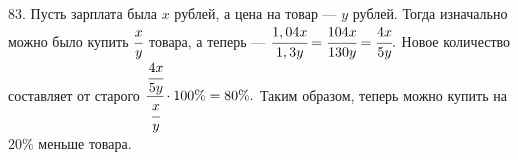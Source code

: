 83. Пусть зарплата была $x$ рублей, а цена на товар --- $y$ рублей. Тогда изначально можно было купить $\cfrac{x}{y}$ товара, а теперь --- $\cfrac{1,04x}{1,3y}=\cfrac{104x}{130y}=\cfrac{4x}{5y}.$ Новое количество составляет от старого $\cfrac{\cfrac{4x}{5y}}{\cfrac{x}{y}}\cdot 100\%=80\%.$ Таким образом, теперь можно купить на $20\%$ меньше товара.\\
